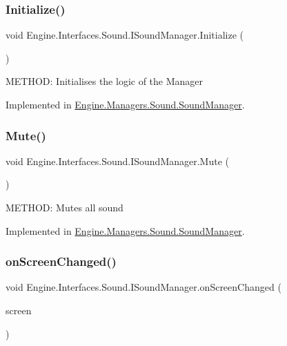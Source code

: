 \subsubsection{\texorpdfstring{Initialize()}{Initialize()}}
{\footnotesize\ttfamily void Engine.\+Interfaces.\+Sound.\+I\+Sound\+Manager.\+Initialize (\begin{DoxyParamCaption}{ }\end{DoxyParamCaption})}



M\+E\+T\+H\+OD\+: Initialises the logic of the Manager 



Implemented in \hyperlink{a00546_a06224065983b6fe162de98b8dcc944c2}{Engine.\+Managers.\+Sound.\+Sound\+Manager}.

\mbox{\label{a00482_a5bcad4d517b37a12b17e59d0b927ca37}} 
\subsubsection{\texorpdfstring{Mute()}{Mute()}}
{\footnotesize\ttfamily void Engine.\+Interfaces.\+Sound.\+I\+Sound\+Manager.\+Mute (\begin{DoxyParamCaption}{ }\end{DoxyParamCaption})}



M\+E\+T\+H\+OD\+: Mutes all sound 



Implemented in \hyperlink{a00546_a5a3a9b96e6708deedf2c4939b3259011}{Engine.\+Managers.\+Sound.\+Sound\+Manager}.

\mbox{\label{a00482_a8aa47dcffde058c1146f7ebf5b0edb84}} 
\subsubsection{\texorpdfstring{on\+Screen\+Changed()}{onScreenChanged()}}
{\footnotesize\ttfamily void Engine.\+Interfaces.\+Sound.\+I\+Sound\+Manager.\+on\+Screen\+Changed (\begin{DoxyParamCaption}\item[{\hyperlink{a00550}{Base\+Screen}}]{screen }\end{DoxyParamCaption})}



